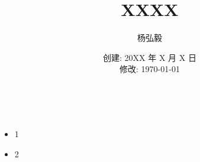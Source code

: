 \documentclass[11pt]{article}
\title{XXXX}
\author{杨弘毅}
\date{创建: 20XX 年 X 月 X 日 \\修改: \today}
\begin{document}
\maketitle

\begin{equation*}
\end{equation*}


\begin{align*}
\end{align*}

\begin{itemize}
	\setlength\itemsep{0em}
	\item 1
	\item 2
\end{itemize}
\end{document}
